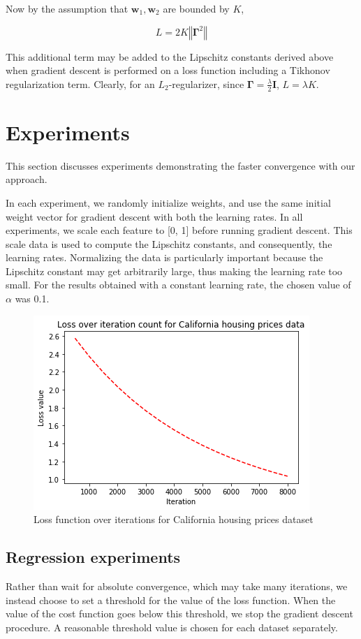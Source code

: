 \documentclass{article}
\begin{document}
Now by the assumption that $\textbf{w}_1, \textbf{w}_2$ are bounded by $K$, 

\[
    \boxed{
        L = 2K \left\Vert \boldsymbol\Gamma^2 \right\Vert
    }
\]

This additional term may be added to the Lipschitz constants derived above when gradient descent is performed on a loss function including a Tikhonov regularization term. Clearly, for an $L_2$-regularizer, since $\boldsymbol\Gamma = \frac{\lambda}{2}\textbf{I}$, $L = \lambda K$.

\section{Experiments}
This section discusses experiments demonstrating the faster convergence with our approach. 

In each experiment, we randomly initialize weights, and use the same initial weight vector for gradient descent with both the learning rates. In all experiments, we scale each feature to [0, 1] before running gradient descent. This scale data is used to compute the Lipschitz constants, and consequently, the learning rates. Normalizing the data is particularly important because the Lipschitz constant may get arbitrarily large, thus making the learning rate too small. For the results obtained with a constant learning rate, the chosen value of $\alpha$ was 0.1.

\begin{figure}
    \centering
    \includegraphics[scale=0.5]{cali.png}
    \caption{Loss function over iterations for California housing prices dataset}
    \label{fig:leastsq:1}
\end{figure}

\subsection{Regression experiments}
Rather than wait for absolute convergence, which may take many iterations, we instead choose to set a threshold for the value of the loss function. When the value of the cost function goes below this threshold, we stop the gradient descent procedure. A reasonable threshold value is chosen for each dataset separately.
\end{document}
